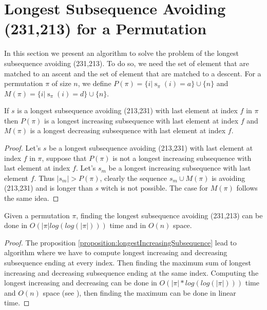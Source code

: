 \documentclass[a4paper]{llncs}
\newcommand{\ptext}{\pi}
\DeclareMathOperator{\stripea}{s}
\newcommand{\stripe}[2]{\stripea_{{#1}}({#2})}
\newcounter{num}
\newcommand{\dstep}{d}
\newcommand{\ustep}{a}
\begin{document}

\section{Longest Subsequence Avoiding \\(231,213) for a Permutation}
\label{section:LCS}

	In this section we present an algorithm to solve the problem
	of the longest subsequence avoiding (231,213).
	To do so, we need the set of element
	that are matched to an ascent and the
	set of element that are matched to a descent.
	For a permutation $\pi$ of size $n$, we define
	$P(\pi) = \{i | \stripe{\pi}{i} = \ustep \} \cup \{n\}$ and  
	$M(\pi) = \{i | \stripe{\pi}{i} = \dstep \} \cup \{n\}$.\\
	
	\begin{proposition}
	\label{proposition:longestIncreasingSubsequence}
	If $s$ is a longest subsequence avoiding (213,231) with last element at index $f$ in $\pi$ then
	$P(\pi)$ is a longest increasing subsequence with last element at index $f$ and
	$M(\pi)$ is a longest decreasing subsequence with last element at index $f$.	
	\end{proposition}
	
	\begin{proof}
	Let's $s$ be a longest subsequence avoiding (213,231) with last element at index $f$ in $\pi$, 
	suppose that $P(\pi)$ is not a longest increasing subsequence with last element at index $f$. Let's $s_m$ be a longest increasing subsequence with last element $f$.
	Thus $|s_m|>P(\pi)$, clearly the sequence $s_m \cup M(\pi)$
	is avoiding (213,231) and is longer than $s$ witch is not possible. 
	The case for $M(\pi)$ follows the same idea.
	\end{proof}

	\begin{proposition}
	Given a permutation $\pi$, 
	finding the longest subsequence avoiding (231,213)
	can be done in $O(|\ptext|log(log(|\ptext|)))$ time and in $O(n)$ space.	
	\end{proposition}
	
	\begin{proof}
	The proposition \ref{proposition:longestIncreasingSubsequence} lead to algorithm 
	where we have to compute longest increasing and decreasing subsequence ending at every index. Then finding the maximum sum of longest increasing and decreasing subsequence ending at the same index.
	Computing the longest increasing and decreasing can be done in $O(|\ptext|*log(log(|\ptext|)))$ time and $O(n)$ space (see \cite{Bespamyatnikh00enumeratinglongest}), then finding the maximum can be done in linear time.
	\end{proof}
\end{document}
